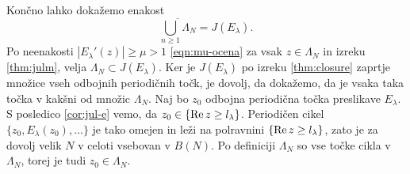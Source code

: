 \noindent Končno lahko dokažemo enakost
\[\overline{\bigcup_{n \geq 1} \Lambda_N} = J (E_\lambda).\]
Po neenakosti \(|E_\lambda' (z)| \geq \mu > 1\) \eqref{eqn:mu-ocena} za vsak \(z \in \Lambda_N\) in izreku \ref{thm:julm}, velja \(\Lambda_N \subset J (E_\lambda)\). Ker je \(J (E_\lambda)\) po izreku \ref{thm:closure} zaprtje množice vseh odbojnih periodičnih točk, je dovolj, da dokažemo, da je vsaka taka točka v kakšni od množic \(\Lambda_N\). Naj bo \(z_0\) odbojna periodična točka preslikave \(E_\lambda\). S posledico \ref{cor:jul-e} vemo, da \(z_0 \in \{\operatorname{Re} z \geq l_\lambda\}\). Periodičen cikel \(\{z_0, E_\lambda (z_0), \dots\}\) je tako omejen in leži na polravnini \(\{\operatorname{Re} z \geq l_\lambda\}\), zato je za dovolj velik \(N\) v celoti vsebovan v \(B (N)\). Po definiciji \(\Lambda_N\) so vse točke cikla v \(\Lambda_N\), torej je tudi \(z_0 \in \Lambda_N\).

